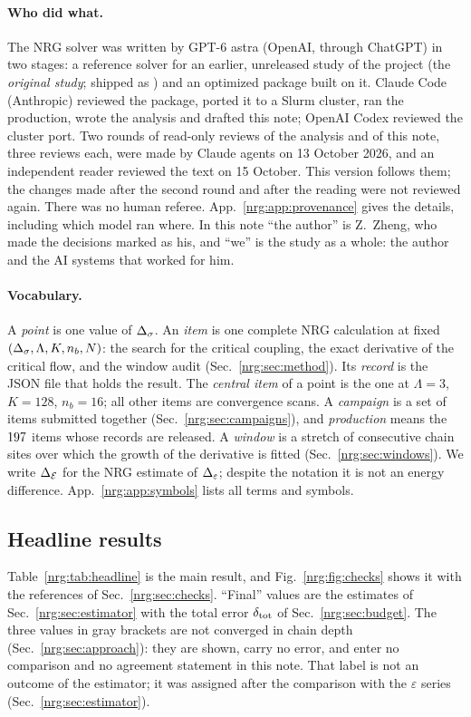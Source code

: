 \paragraph{Who did what.} The NRG solver was written by GPT-6 astra (OpenAI, through ChatGPT) in two stages: a reference solver for
an earlier, unreleased study of the project (the \emph{original study}; shipped as ) and
an optimized package built on it. Claude Code (Anthropic) reviewed the package, ported it to a Slurm cluster, ran the production,
wrote the analysis and drafted this note; OpenAI Codex reviewed the cluster port. Two rounds of read-only reviews of the analysis
and of this note, three reviews each, were made by Claude agents on 13 October 2026, and an independent reader reviewed the text on
15 October. This version follows them; the changes made after the second round and after the reading were not reviewed again.
There was no human referee. App.~\ref{nrg:app:provenance} gives the details, including which model ran where. In this note ``the
author'' is Z.~Zheng, who made the decisions marked as his, and ``we'' is the study as a whole: the author and the AI systems that
worked for him.

\paragraph{Vocabulary.} A \emph{point} is one value of $\Delta_\sigma$. An \emph{item} is one complete NRG calculation at fixed
$(\Delta_\sigma,\Lambda,K,n_b,N)$: the search for the critical coupling, the exact derivative of the critical flow, and the window audit
(Sec.~\ref{nrg:sec:method}). Its \emph{record} is the JSON file that holds the result. The \emph{central item} of a point is the one at
$\Lambda=3$, $K=128$, $n_b=16$; all other items are convergence scans. A \emph{campaign} is a set of items submitted together
(Sec.~\ref{nrg:sec:campaigns}), and \emph{production} means the $197$ items whose records are released. A \emph{window} is a
stretch of consecutive chain sites over which the growth of the derivative is fitted (Sec.~\ref{nrg:sec:windows}). We write $\Delta_{\mathcal E}$ for the
NRG estimate of $\Delta_\varepsilon$; despite the notation it is not an energy difference. App.~\ref{nrg:app:symbols} lists all terms and symbols.

\subsection{Headline results}
Table~\ref{nrg:tab:headline} is the main result, and Fig.~\ref{nrg:fig:checks} shows it with the references of Sec.~\ref{nrg:sec:checks}.
``Final'' values are the estimates of Sec.~\ref{nrg:sec:estimator} with the total error $\delta_{\rm tot}$ of Sec.~\ref{nrg:sec:budget}. The three values
in gray brackets are not converged in chain depth (Sec.~\ref{nrg:sec:approach}): they are shown, carry no error, and enter no comparison
and no agreement statement in this note. That label is not an outcome of the estimator; it was assigned after the comparison with
the $\varepsilon$ series (Sec.~\ref{nrg:sec:estimator}).


